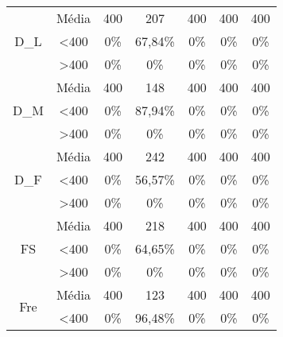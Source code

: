 \begin{table}[]
\begin{tabular}{|c|c|ccccc|}
\multirow{3}{*}{D\_L}           & Média            & 400               & 207               & 400               & 400               & 400               \\
                                & \textless 400    & 0\%            & 67,84\%           & 0\%            & 0\%            & 0\%            \\
                                & \textgreater 400 & 0\%            & 0\%            & 0\%            & 0\%            & 0\%            \\ \hline
\multirow{3}{*}{D\_M}           & Média            & 400               & 148               & 400               & 400               & 400               \\
                                & \textless 400    & 0\%            & 87,94\%           & 0\%            & 0\%            & 0\%            \\
                                & \textgreater 400 & 0\%            & 0\%            & 0\%            & 0\%            & 0\%            \\ \hline
\multirow{3}{*}{D\_F}           & Média            & 400               & 242               & 400               & 400               & 400               \\
                                & \textless 400    & 0\%            & 56,57\%           & 0\%            & 0\%            & 0\%            \\
                                & \textgreater 400 & 0\%            & 0\%            & 0\%            & 0\%            & 0\%            \\ \hline
\multirow{3}{*}{FS}             & Média            & 400               & 218               & 400               & 400               & 400               \\
                                & \textless 400    & 0\%            & 64,65\%           & 0\%            & 0\%            & 0\%            \\
                                & \textgreater 400 & 0\%            & 0\%            & 0\%            & 0\%            & 0\%            \\ \hline
\multirow{3}{*}{Fre}            & Média            & 400               & 123               & 400               & 400               & 400               \\
                                & \textless 400    & 0\%            & 96,48\%           & 0\%            & 0\%            & 0\%            \\

\end{tabular}
\end{table}
